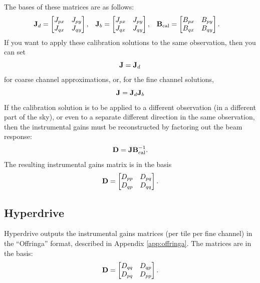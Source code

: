 \documentclass{book}
\begin{document}
The bases of these matrices are as follows:
\begin{align}
    {\bf J}_d &= \begin{bmatrix} J_{px} & J_{py} \\ J_{qx} & J_{qy} \end{bmatrix}, &
    {\bf J}_b &= \begin{bmatrix} J_{px} & J_{py} \\ J_{qx} & J_{qy} \end{bmatrix}, &
    {\bf B}_\text{cal} &= \begin{bmatrix} B_{px} & B_{py} \\ B_{qx} & B_{qy} \end{bmatrix}.
\end{align}
If you want to apply these calibration solutions to the same observation, then you can set
\begin{equation}
    {\bf J} = {\bf J}_d
\end{equation}
for coarse channel approximations, or, for the fine channel solutions,
\begin{equation}
    {\bf J} = {\bf J}_d {\bf J}_b
\end{equation}
If the calibration solution is to be applied to a different observation (in a different part of the sky), or even to a separate different direction in the same observation, then the instrumental gains must be reconstructed by factoring out the beam response:
\begin{equation}
    {\bf D} = {\bf J}{\bf B}_\text{cal}^{-1}.
\end{equation}
The resulting instrumental gains matrix is in the basis
\begin{equation}
    {\bf D} = \begin{bmatrix} D_{pp} & D_{pq} \\ D_{qp} & D_{qq} \end{bmatrix}.
\end{equation}

\subsection{Hyperdrive}
\label{sec:hyperdrive}

Hyperdrive outputs the instrumental gains matrices (per tile per fine channel) in the ``Offringa'' format, described in Appendix \ref{app:offringa}.
The matrices are in the basis:
\begin{equation}
    {\bf D} = \begin{bmatrix}
        D_{qq} & D_{qp} \\
        D_{pq} & D_{pp}
    \end{bmatrix}.
\end{equation}
\end{document}
